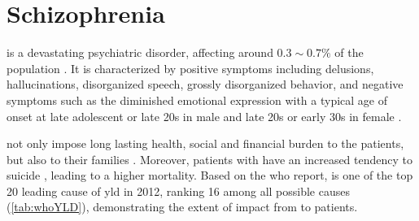 
	\section{Schizophrenia}
	 is a devastating psychiatric disorder, affecting around $0.3\sim0.7\%$ of the population \citep{AmericanPsychiatricAssociation2013}.
	It is characterized by positive symptoms including delusions, hallucinations, disorganized speech, grossly disorganized behavior, and negative symptoms such as the diminished emotional expression \citep{AmericanPsychiatricAssociation2013} with a typical age of onset at late adolescent or late 20s in male and late 20s or early 30s in female \citep{Schultz2007}.
	
	 not only impose long lasting health, social and financial burden to the patients, but also to their families \citep{Knapp2004}. 
	Moreover, patients with  have an increased tendency to suicide \citep{Saha2007}, leading to a higher mortality.
	Based on the \gls{who} report,  is one of the top 20 leading cause of \gls{yld} in 2012, ranking 16 among all possible causes (\cref{tab:whoYLD}), demonstrating the extent of impact from  to patients.
